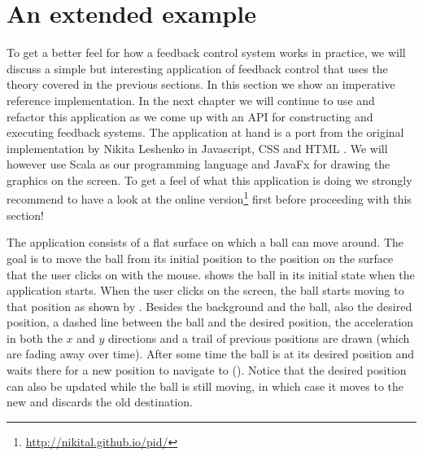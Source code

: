 \section{An extended example}
To get a better feel for how a feedback control system works in practice, we will discuss a simple but interesting application of feedback control that uses the theory covered in the previous sections. In this section we show an imperative reference implementation. In the next chapter we will continue to use and refactor this application as we come up with an API for constructing and executing feedback systems. The application at hand is a port from the original implementation by Nikita Leshenko in Javascript, CSS and HTML \cite{nikital-balltracker}. We will however use Scala as our programming language and JavaFx for drawing the graphics on the screen. To get a feel of what this application is doing we strongly recommend to have a look at the online version\footnote{\url{http://nikital.github.io/pid/}} first before proceeding with this section!

The application consists of a flat surface on which a ball can move around. The goal is to move the ball from its initial position to the position on the surface that the user clicks on with the mouse.  shows the ball in its initial state when the application starts. When the user clicks on the screen, the ball starts moving to that position as shown by . Besides the background and the ball, also the desired position, a dashed line between the ball and the desired position, the acceleration in both the $x$ and $y$ directions and a trail of previous positions are drawn (which are fading away over time). After some time the ball is at its desired position and waits there for a new position to navigate to (). Notice that the desired position can also be updated while the ball is still moving, in which case it moves to the new and discards the old destination.


